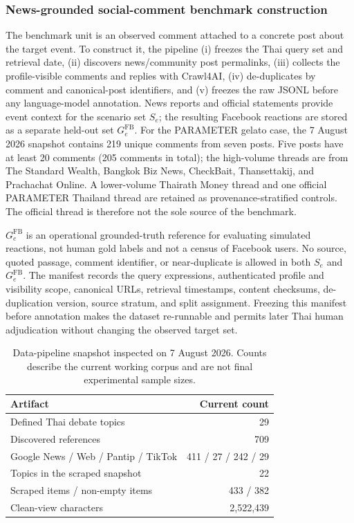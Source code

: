 \documentclass[conference]{IEEEtran}
\begin{document}
\subsubsection{News-grounded social-comment benchmark construction}
\label{sec:comment-benchmark}

The benchmark unit is an observed comment attached to a concrete post about the
target event. To construct it, the pipeline (i) freezes the Thai query set and
retrieval date, (ii) discovers news/community post permalinks, (iii) collects
the profile-visible comments and replies with Crawl4AI, (iv) de-duplicates by
comment and canonical-post identifiers, and (v) freezes the raw JSONL before
any language-model annotation. News reports and official statements provide
event context for the scenario set $S_e$; the resulting Facebook reactions are
stored as a separate held-out set $G_e^{\mathrm{FB}}$. For the PARAMETER gelato
case, the 7 August 2026 snapshot contains 219 unique comments from seven
posts. Five posts have at least 20 comments (205 comments in total); the
high-volume threads are from The Standard Wealth, Bangkok Biz News, CheckBait,
Thansettakij, and Prachachat Online. A lower-volume Thairath Money thread and
one official PARAMETER Thailand thread are retained as provenance-stratified
controls. The official thread is therefore not the sole source of the
benchmark.

$G_e^{\mathrm{FB}}$ is an operational grounded-truth reference for evaluating
simulated reactions, not human gold labels and not a census of Facebook users.
No source, quoted passage, comment identifier, or near-duplicate is allowed in
both $S_e$ and $G_e^{\mathrm{FB}}$. The manifest records the query expressions,
authenticated profile and visibility scope, canonical URLs, retrieval
timestamps, content checksums, de-duplication version, source stratum, and
split assignment. Freezing this manifest before annotation makes the dataset
re-runnable and permits later Thai human adjudication without changing the
observed target set.

\begin{table}[t]
\caption{Data-pipeline snapshot inspected on 7 August 2026. Counts describe
the current working corpus and are not final experimental sample sizes.}
\label{tab:data-snapshot}
\centering
\footnotesize
\begin{tabular}{@{}lr@{}}
\toprule
Artifact & Current count \\
\midrule
Defined Thai debate topics & 29 \\
Discovered references & 709 \\
\quad Google News / Web / Pantip / TikTok & 411 / 27 / 242 / 29 \\
Topics in the scraped snapshot & 22 \\
Scraped items / non-empty items & 433 / 382 \\
Clean-view characters & 2,522,439 \\
\bottomrule
\end{tabular}
\end{table}
\end{document}
